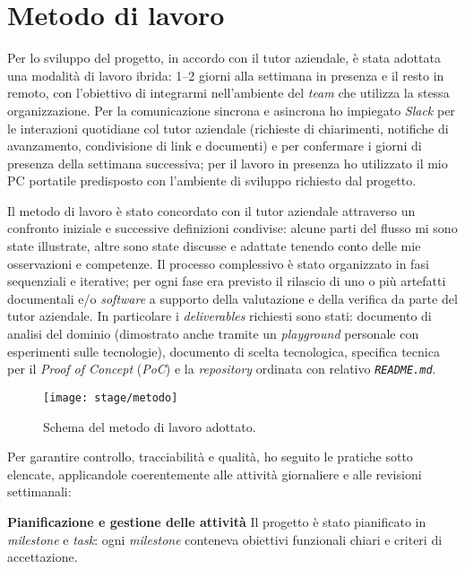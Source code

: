 \section{Metodo di lavoro}

Per lo sviluppo del progetto, in accordo con il tutor aziendale, è stata adottata una modalità di lavoro ibrida: 1–2 giorni alla settimana in presenza e il resto in remoto, 
con l'obiettivo di integrarmi nell'ambiente del \emph{team} che utilizza la stessa organizzazione. Per la comunicazione sincrona e asincrona ho impiegato 
\emph{Slack} per le interazioni quotidiane col tutor aziendale (richieste di chiarimenti, notifiche di avanzamento, condivisione di link e documenti) e per confermare i giorni di presenza 
della settimana successiva; per il lavoro in presenza ho utilizzato il mio PC portatile predisposto con l'ambiente di sviluppo richiesto dal progetto.

Il metodo di lavoro è stato concordato con il tutor aziendale attraverso un confronto iniziale e successive definizioni condivise: alcune parti del 
flusso mi sono state illustrate, altre sono state discusse e adattate tenendo conto delle mie osservazioni e competenze. Il processo complessivo è stato organizzato 
in fasi sequenziali e iterative; per ogni fase era previsto il rilascio di uno o più artefatti documentali e/o \emph{software} a supporto della valutazione e della 
verifica da parte del tutor aziendale. In particolare i \emph{deliverables} richiesti sono stati: documento di analisi del dominio (dimostrato anche tramite un \emph{playground} 
personale con esperimenti sulle tecnologie), documento di scelta tecnologica, specifica tecnica per il \emph{Proof of Concept} (\emph{PoC}) e la \emph{repository} ordinata 
con relativo \texttt{\emph{README.md}}.

\begin{figure}[H]
    \centering
    \texttt{[image: stage/metodo]}
    \caption{Schema del metodo di lavoro adottato.}
    \label{fig:metodo}
\end{figure}

Per garantire controllo, tracciabilità e qualità, ho seguito le pratiche sotto elencate, applicandole coerentemente alle attività giornaliere e alle revisioni settimanali:

\medskip
\noindent\textbf{Pianificazione e gestione delle attività}
Il progetto è stato pianificato in \emph{milestone} e \emph{task}: ogni \emph{milestone} conteneva obiettivi funzionali chiari e criteri di accettazione. 

